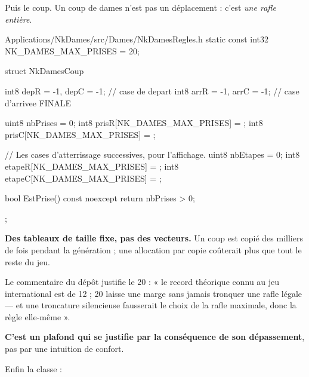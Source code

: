 Puis le coup. Un coup de dames n'est pas un déplacement : c'est \emph{une rafle
entière}.

\begin{nkcode}{Applications/NkDames/src/Dames/NkDamesRegles.h}
        static const int32 NK_DAMES_MAX_PRISES = 20;

        struct NkDamesCoup {
                int8 depR = -1, depC = -1;   // case de depart
                int8 arrR = -1, arrC = -1;   // case d'arrivee FINALE

                uint8 nbPrises = 0;
                int8 prisR[NK_DAMES_MAX_PRISES] = {};
                int8 prisC[NK_DAMES_MAX_PRISES] = {};

                // Les cases d'atterrissage successives, pour l'affichage.
                uint8 nbEtapes = 0;
                int8 etapeR[NK_DAMES_MAX_PRISES] = {};
                int8 etapeC[NK_DAMES_MAX_PRISES] = {};

                bool EstPrise() const noexcept { return nbPrises > 0; }
        };
\end{nkcode}

\begin{nkretenir}
\textbf{Des tableaux de taille fixe, pas des vecteurs.} Un coup est copié des
milliers de fois pendant la génération ; une allocation par copie coûterait
plus que tout le reste du jeu.

Le commentaire du dépôt justifie le 20 : « le record théorique connu au jeu
international est de 12 ; 20 laisse une marge sans jamais tronquer une rafle
légale --- et une troncature silencieuse fausserait le choix de la rafle
maximale, donc la règle elle-même ».

\textbf{C'est un plafond qui se justifie par la conséquence de son
dépassement}, pas par une intuition de confort.
\end{nkretenir}

Enfin la classe :

